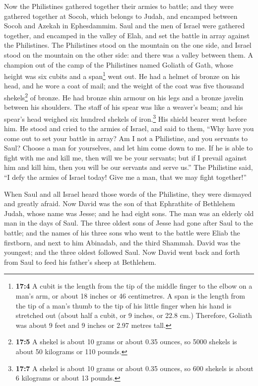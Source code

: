  Now the Philistines gathered together their armies to
battle; and they were gathered together at Socoh, which belongs to
Judah, and encamped between Socoh and Azekah in Ephesdammim.
 Saul and the men of Israel were gathered together, and
encamped in the valley of Elah, and set the battle in array against the
Philistines.  The Philistines stood on the mountain on the
one side, and Israel stood on the mountain on the other side: and there
was a valley between them.  A champion out of the camp of
the Philistines named Goliath of Gath, whose height was six cubits and a
span\footnote{\textbf{17:4} A cubit is the length from the tip of the
  middle finger to the elbow on a man's arm, or about 18 inches or 46
  centimetres. A span is the length from the tip of a man's thumb to the
  tip of his little finger when his hand is stretched out (about half a
  cubit, or 9 inches, or 22.8 cm.) Therefore, Goliath was about 9 feet
  and 9 inches or 2.97 metres tall.} went out.  He had a
helmet of bronze on his head, and he wore a coat of mail; and the weight
of the coat was five thousand shekels\footnote{\textbf{17:5} A shekel is
  about 10 grams or about 0.35 ounces, so 5000 shekels is about 50
  kilograms or 110 pounds.} of bronze.  He had bronze shin
armour on his legs and a bronze javelin between his shoulders.
 The staff of his spear was like a weaver's beam; and his
spear's head weighed six hundred shekels of iron.\footnote{\textbf{17:7}
  A shekel is about 10 grams or about 0.35 ounces, so 600 shekels is
  about 6 kilograms or about 13 pounds.} His shield bearer went before
him.  He stood and cried to the armies of Israel, and said
to them, ``Why have you come out to set your battle in array? Am I not a
Philistine, and you servants to Saul? Choose a man for yourselves, and
let him come down to me.  If he is able to fight with me
and kill me, then will we be your servants; but if I prevail against him
and kill him, then you will be our servants and serve us.''
 The Philistine said, ``I defy the armies of Israel
today! Give me a man, that we may fight together!''

 When Saul and all Israel heard those words of the
Philistine, they were dismayed and greatly afraid.  Now
David was the son of that Ephrathite of Bethlehem Judah, whose name was
Jesse; and he had eight sons. The man was an elderly old man in the days
of Saul.  The three oldest sons of Jesse had gone after
Saul to the battle; and the names of his three sons who went to the
battle were Eliab the firstborn, and next to him Abinadab, and the third
Shammah.  David was the youngest; and the three oldest
followed Saul.  Now David went back and forth from Saul
to feed his father's sheep at Bethlehem.

